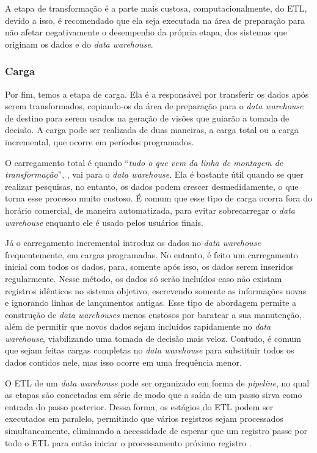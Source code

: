 A etapa de transformação é a parte mais custosa, computacionalmente, do ETL, devido a isso, é recomendado que ela seja executada na área de preparação para não afetar negativamente o desempenho da própria etapa, dos sistemas que originam os dados e do \textit{data warehouse}.

\subsubsection{Carga}
\label{subsec:carga}
Por fim, temos a etapa de carga. Ela é a responsável por transferir os dados após serem transformados, copiando-os da área de preparação para o \textit{data warehouse} de destino para serem usados na geração de visões que guiarão a tomada de decisão. A carga pode ser realizada de duas maneiras, a carga total ou a carga incremental, que ocorre em períodos programados.

O carregamento total é quando \enquote{\textit{tudo o que vem da linha de montagem de transformação}}, \cite{vida2021datawarehouse}, vai para o \textit{data warehouse}. Ela é bastante útil quando se quer realizar pesquisas, no entanto, os dados podem crescer desmedidamente, o que torna esse processo muito custoso. É comum que esse tipo de carga ocorra fora do horário comercial, de maneira automatizada, para evitar sobrecarregar o \textit{data warehouse} enquanto ele é usado pelos usuários finais.

Já o carregamento incremental introduz os dados no \textit{data warehouse} frequentemente, em cargas programadas. No entanto, é feito um carregamento inicial com todos os dados, para, somente após isso, os dados serem inseridos regularmente. Nesse método, os dados só serão incluídos caso não existam registros idênticos no sistema objetivo, escrevendo somente as informações novas e ignorando linhas de lançamentos antigas. Esse tipo de abordagem permite a construção de \textit{data warehouses} menos custosos por baratear a sua manutenção, além de permitir que novos dados sejam incluídos rapidamente no \textit{data warehouse}, viabilizando uma tomada de decisão mais veloz. Contudo, é comum que sejam feitas cargas completas no \textit{data warehouse} para substituir todos os dados contidos nele, mas isso ocorre em uma frequência menor.

O ETL de um \textit{data warehouse} pode ser organizado em forma de \textit{pipeline}, no qual as etapas são conectadas em série de modo que a saída de um passo sirva como entrada do passo posterior. Dessa forma, os estágios do ETL podem ser executados em paralelo, permitindo que vários registros sejam processados simultaneamente, eliminando a necessidade de esperar que um registro passe por todo o ETL para então iniciar o processamento próximo registro \cite{vida2021datawarehouse}.


